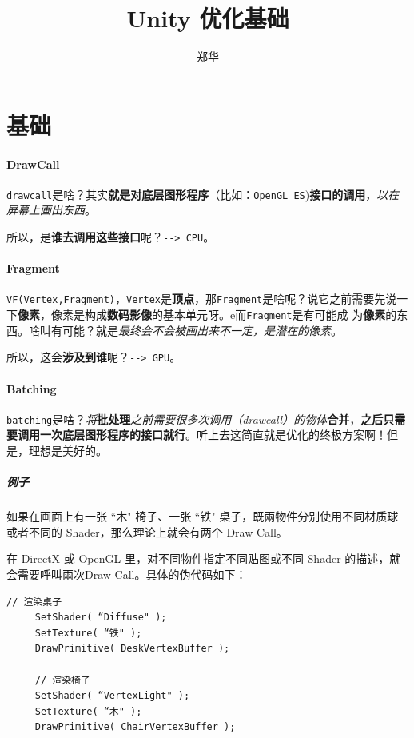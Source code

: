 \documentclass[UTF8,a4paper,12pt]{ctexart}
\author{\kaishu 郑华}
\title{\heiti Unity 优化基础}
\begin{document}
 	\maketitle
 	
 	\newpage
 	\tableofcontents
 	
  \newpage
  \section{基础}
	  	\paragraph{DrawCall}
	  		\verb|drawcall|是啥？其实\textbf{就是对底层图形程序}（比如：\verb|OpenGL ES|)\textbf{接口的调用}，\textit{以在屏幕上画出东西}。
	  			
	  		
	  		所以，是\textbf{谁去调用这些接口}呢？\verb|--> CPU|。
	  		
	  	\paragraph{Fragment}
	  		\verb|VF(Vertex,Fragment)|，\verb|Vertex|是\textbf{顶点}，那\verb|Fragment|是啥呢？说它之前需要先说一下\textbf{像素}，像素是构成\textbf{数码影像}的基本单元呀。e而\verb|Fragment|是有可能成
	  		为\textbf{像素}的东西。啥叫有可能？就是\textit{最终会不会被画出来不一定，是潜在的像素}。
	  		
	  		所以，这会\textbf{涉及到谁}呢？\verb|--> GPU|。
	  		
	  	\paragraph{Batching}
	  		\verb|batching|是啥？\textit{将}\textbf{批处理}\textit{之前需要很多次调用（drawcall）的物体}\textbf{合并}，\textbf{之后只需要调用一次底层图形程序的接口就行}。听上去这简直就是优化的终极方案啊！但是，理想是美好的。
	  		
	  		\subparagraph{例子}
	  			如果在画面上有一张 “木" 椅子、一张 “铁" 桌子，既兩物件分别使用不同材质球或者不同的 Shader，那么理论上就会有两个 Draw Call。
	  			
	  			在 DirectX 或 OpenGL 里，对不同物件指定不同贴图或不同 Shader 的描述，就会需要呼叫兩次Draw Call。具体的伪代码如下：
	  				\begin{lstlisting}[frame = L, xleftmargin = .079\textwidth]
	 // 渲染桌子
	 SetShader( “Diffuse" );
	 SetTexture( “铁" );
	 DrawPrimitive( DeskVertexBuffer );   	
	 
	 // 渲染椅子
	 SetShader( “VertexLight" );
	 SetTexture( “木" );
	 DrawPrimitive( ChairVertexBuffer );				
	  				\end{lstlisting}
	  			
\end{document}

